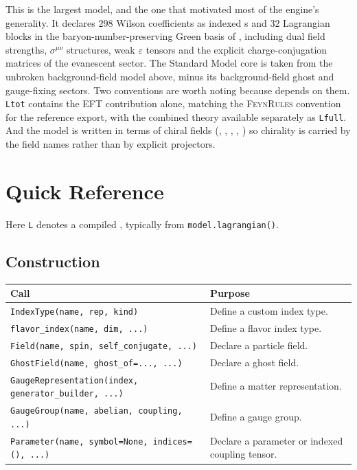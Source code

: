 \noindent This is the largest model, and the one that motivated most of the engine's generality. It declares $298$ Wilson coefficients as indexed s and $32$ Lagrangian blocks in the baryon-number-preserving Green basis of , including dual field strengths, $\sigma^{\mu\nu}$ structures, weak $\varepsilon$ tensors and the explicit charge-conjugation matrices of the evanescent sector. The Standard Model core is taken from the unbroken background-field model above, minus its background-field ghost and gauge-fixing sectors. Two conventions are worth noting because  depends on them. \texttt{Ltot} contains the EFT contribution alone, matching the \textsc{FeynRules} convention for the reference export, with the combined theory available separately as \texttt{Lfull}. And the model is written in terms of chiral fields (, , , , ) so chirality is carried by the field names rather than by explicit projectors.

\section{Quick Reference}
\label{sec:feynpy-quickref}

\noindent
Here \texttt{L} denotes a compiled , typically from
\texttt{model.lagrangian()}.

\subsection*{Construction}

\begin{center}
\begin{tabular}{@{}P{5.4cm}p{7cm}@{}}
\toprule
\normalfont\textbf{Call} & \textbf{Purpose} \\
\midrule
\texttt{IndexType(name, rep, kind)} & Define a custom index type. \\
\texttt{flavor\_index(name, dim, ...)} & Define a flavor index type. \\
\texttt{Field(name, spin, self\_conjugate, ...)} & Declare a particle field. \\
\texttt{GhostField(name, ghost\_of=..., ...)} & Declare a ghost field. \\
\texttt{GaugeRepresentation(index, generator\_builder, ...)} & Define a matter representation. \\
\texttt{GaugeGroup(name, abelian, coupling, ...)} & Define a gauge group. \\
\texttt{Parameter(name, symbol=None, indices=(), ...)} & Declare a parameter or indexed coupling tensor. \\
\bottomrule
\end{tabular}
\end{center}

